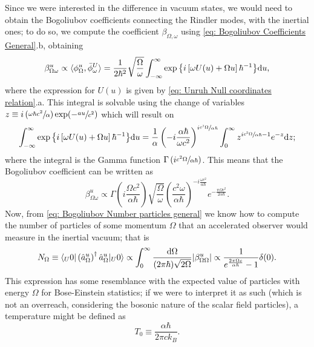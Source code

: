 Since we were interested in the difference in vacuum states, we would need to obtain the Bogoliubov coefficients connecting the Rindler modes, with the inertial ones; to do so, we compute the coefficient $\beta_{\Omega,\omega}$ using \ref{eq: Bogoliubov Coefficients General}.b, obtaining
\begin{equation}
	\beta_{\Omega\omega}^u\propto \langle \phi^u_\Omega,\bar\phi_\omega^{U}\rangle=\frac{1}{2\hbar^2}\sqrt{\frac{\Omega}{\omega}}\int_{-\infty}^\infty\exp{\left\{i\left[\omega U(u)+\Omega u\right]\hbar^{-1}\right\}}\text{d} u,
\end{equation}
where the expression for $U(u)$ is given by \ref{eq: Unruh Null coordinates relation}.a. This integral is solvable using the change of variables $z\equiv i\left(\sfrac{\omega\hbar c^2}{\alpha}\right)\exp{\!\left(-\sfrac{a u}{c^2}\right)}$ which will result on
\begin{equation}
	\int_{-\infty}^\infty\exp{\left\{i\left[\omega U(u)+\Omega u\right]\hbar^{-1}\right\}}\text{d} u=\frac{1}{\alpha}\left(-i\frac{\alpha\hbar}{\omega c^2}\right)^{i\sfrac{c^2\Omega}{\alpha\hbar}}\int^\infty_0z^{i\sfrac{c^2\Omega}{\alpha\hbar}-1}e^{-z}\text{d} z;
\end{equation}
where the integral is the Gamma function $\Gamma\left(i\sfrac{c^2\Omega}{\alpha\hbar}\right)$. This means that the Bogoliubov coefficient can be written as
\begin{equation}
	\beta_{\Omega\omega}^u\propto \Gamma\left(i\frac{\Omega c^2}{\alpha\hbar }\right)\sqrt{\frac{\Omega}{\omega}}\left(\frac{c^2\omega}{\alpha\hbar }\right)^{-i\frac{\omega c^2}{\alpha\hbar}}e^{-\frac{\pi\Omega c^2}{2\alpha\hbar}}.
\end{equation}
Now, from \ref{eq: Bogoliubov Number particles general} we know how to compute the number of particles of some momentum $\Omega$ that an accelerated observer would measure in the inertial vacuum; that is
\begin{equation}
	N_\Omega\equiv\langle_U 0|\left(\hat{a}_\Omega^u\right)^\dagger\hat{a}^u_\Omega|_U0\rangle\propto\int_0^\infty\frac{\text{d}\Omega}{(2\pi\hbar)\sqrt{2\Omega}}|\beta^u_{\Omega\Omega}|\propto\frac{1}{e^{\frac{2\pi\Omega c}{\alpha\hbar}}-1}\delta(0).
\end{equation}
This expression has some resemblance with the expected value of particles with energy $\Omega$ for Bose-Einstein statistics; if we were to interpret it as such (which is not an overreach, considering the bosonic nature of the scalar field particles), a temperature might be defined as
\begin{equation}
	T_0\equiv \frac{\alpha\hbar}{2\pi ck_B}.
\end{equation}
